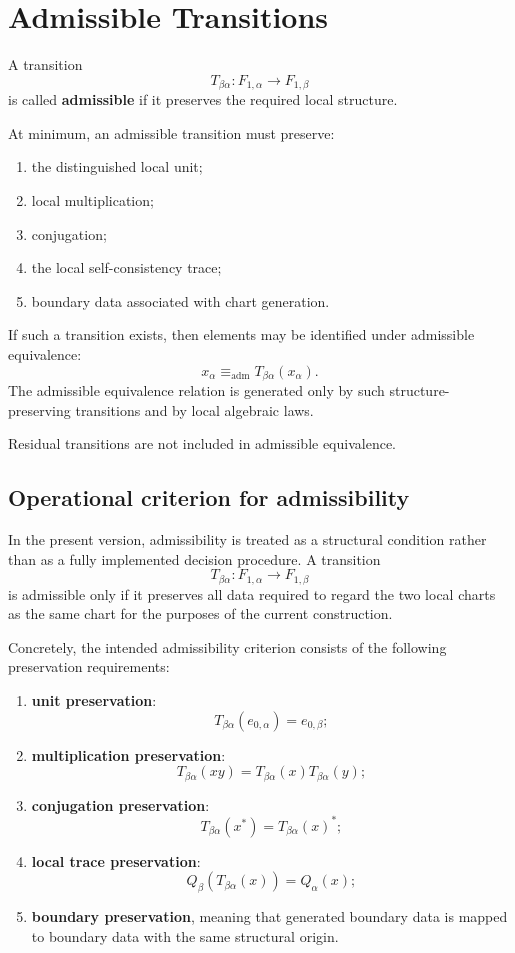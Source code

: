 \documentclass[11pt]{article}
\begin{document}
\section{Admissible Transitions}
\label{sec:admissible-transitions}

A transition
\[
T_{\beta\alpha}:F_{1,\alpha}\to F_{1,\beta}
\]
is called \textbf{admissible} if it preserves the required local structure.

At minimum, an admissible transition must preserve:
\begin{enumerate}
  \item the distinguished local unit;
  \item local multiplication;
  \item conjugation;
  \item the local self-consistency trace;
  \item boundary data associated with chart generation.
\end{enumerate}

If such a transition exists, then elements may be identified under admissible equivalence:
\[
x_\alpha\equiv_{\mathrm{adm}}T_{\beta\alpha}(x_\alpha).
\]
The admissible equivalence relation is generated only by such structure-preserving transitions and by local algebraic laws.

Residual transitions are not included in admissible equivalence.

\subsection*{Operational criterion for admissibility}

In the present version, admissibility is treated as a structural condition rather than as a fully implemented decision procedure. A transition
\[
T_{\beta\alpha}:F_{1,\alpha}\to F_{1,\beta}
\]
is admissible only if it preserves all data required to regard the two local charts as the same chart for the purposes of the current construction.

Concretely, the intended admissibility criterion consists of the following preservation requirements:
\begin{enumerate}
  \item \textbf{unit preservation}:
  \[
  T_{\beta\alpha}(e_{0,\alpha})=e_{0,\beta};
  \]
  \item \textbf{multiplication preservation}:
  \[
  T_{\beta\alpha}(xy)=T_{\beta\alpha}(x)T_{\beta\alpha}(y);
  \]
  \item \textbf{conjugation preservation}:
  \[
  T_{\beta\alpha}(x^*)=T_{\beta\alpha}(x)^*;
  \]
  \item \textbf{local trace preservation}:
  \[
  Q_\beta(T_{\beta\alpha}(x))=Q_\alpha(x);
  \]
  \item \textbf{boundary preservation}, meaning that generated boundary data is mapped to boundary data with the same structural origin.
\end{enumerate}
\end{document}
